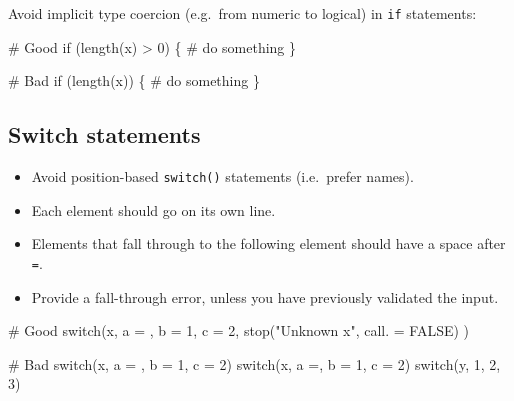 \documentclass[twoside, pagesize, fontsize=11pt, dvipsnames]{scrreport} %
\newenvironment{Shaded}{\begin{snugshade}}{\end{snugshade}}
\newcommand{\AttributeTok}[1]{\textcolor[rgb]{0.40,0.45,0.13}{#1}}
\newcommand{\CommentTok}[1]{\textcolor[rgb]{0.37,0.37,0.37}{#1}}
\newcommand{\ConstantTok}[1]{\textcolor[rgb]{0.56,0.35,0.01}{#1}}
\newcommand{\ControlFlowTok}[1]{\textcolor[rgb]{0.00,0.23,0.31}{#1}}
\newcommand{\DecValTok}[1]{\textcolor[rgb]{0.68,0.00,0.00}{#1}}
\newcommand{\FunctionTok}[1]{\textcolor[rgb]{0.28,0.35,0.67}{#1}}
\newcommand{\NormalTok}[1]{\textcolor[rgb]{0.00,0.23,0.31}{#1}}
\newcommand{\SpecialCharTok}[1]{\textcolor[rgb]{0.37,0.37,0.37}{#1}}
\newcommand{\StringTok}[1]{\textcolor[rgb]{0.13,0.47,0.30}{#1}}
\providecommand{\tightlist}{%
  \setlength{\itemsep}{0pt}\setlength{\parskip}{0pt}}
\begin{document}
Avoid implicit type coercion (e.g.~from numeric to logical) in
\texttt{if} statements:

\begin{Shaded}
\begin{Highlighting}[]
\CommentTok{\# Good}
\ControlFlowTok{if}\NormalTok{ (}\FunctionTok{length}\NormalTok{(x) }\SpecialCharTok{\textgreater{}} \DecValTok{0}\NormalTok{) \{}
  \CommentTok{\# do something}
\NormalTok{\}}

\CommentTok{\# Bad}
\ControlFlowTok{if}\NormalTok{ (}\FunctionTok{length}\NormalTok{(x)) \{}
  \CommentTok{\# do something}
\NormalTok{\}}
\end{Highlighting}
\end{Shaded}

\hypertarget{switch-statements}{%
\subsection{Switch statements}\label{switch-statements}}

\begin{itemize}
\tightlist
\item
  Avoid position-based \texttt{switch()} statements (i.e.~prefer names).
\item
  Each element should go on its own line.
\item
  Elements that fall through to the following element should have a
  space after \texttt{=}.
\item
  Provide a fall-through error, unless you have previously validated the
  input.
\end{itemize}

\begin{Shaded}
\begin{Highlighting}[]
\CommentTok{\# Good }
\ControlFlowTok{switch}\NormalTok{(x, }
  \AttributeTok{a =}\NormalTok{ ,}
  \AttributeTok{b =} \DecValTok{1}\NormalTok{, }
  \AttributeTok{c =} \DecValTok{2}\NormalTok{,}
  \FunctionTok{stop}\NormalTok{(}\StringTok{"Unknown \textasciigrave{}x\textasciigrave{}"}\NormalTok{, }\AttributeTok{call. =} \ConstantTok{FALSE}\NormalTok{)}
\NormalTok{)}

\CommentTok{\# Bad}
\ControlFlowTok{switch}\NormalTok{(x, }\AttributeTok{a =}\NormalTok{ , }\AttributeTok{b =} \DecValTok{1}\NormalTok{, }\AttributeTok{c =} \DecValTok{2}\NormalTok{)}
\ControlFlowTok{switch}\NormalTok{(x, }\AttributeTok{a =}\NormalTok{, }\AttributeTok{b =} \DecValTok{1}\NormalTok{, }\AttributeTok{c =} \DecValTok{2}\NormalTok{)}
\ControlFlowTok{switch}\NormalTok{(y, }\DecValTok{1}\NormalTok{, }\DecValTok{2}\NormalTok{, }\DecValTok{3}\NormalTok{)}
\end{Highlighting}
\end{Shaded}
\end{document}
